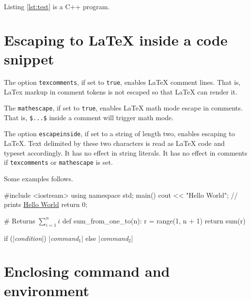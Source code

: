 \documentclass[10pt,a4paper]{article}
\begin{document}
\begin{Example}
  Listing \ref{lst:test} is a C++ program.
\end{Example}

\section{Escaping to \LaTeX{} inside a code snippet}

The option \verb|texcomments|, if set to \texttt{true}, enables \LaTeX{}
comment lines. That is, LaTex markup in comment tokens is not escaped
so that \LaTeX{} can render it.

The \verb|mathescape|, if set to \texttt{true}, enables \LaTeX{} math
mode escape in comments. That is, \verb|$...$| inside a comment will
trigger math mode.

The option \verb|escapeinside|, if set to a string of length two,
enables escaping to \LaTeX{}. Text delimited by these two characters
is read as \LaTeX{} code and typeset accordingly. It has no effect in
string literals. It has no effect in comments if \verb|texcomments| or
\verb|mathescape| is set.

Some examples follows.

\begin{Example}
\begin{pygmented}[lang=c++,texcomments]
#include <iostream>
using namespace std;
main()
{
   cout << "Hello World";  // prints \underline{Hello World}
   return 0;
}
\end{pygmented}
\end{Example}

\begin{Example}
\begin{pygmented}[lang=python,mathescape]
# Returns $\sum_{i=1}^{n}i$
def sum_from_one_to(n):
    r = range(1, n + 1)
    return sum(r)
\end{pygmented}
\end{Example}

\begin{Example}
\begin{pygmented}[lang=c,escapeinside=||]

if (|\textit{condition}|)
    |\textit{command$_1$}|
else
    |\textit{command$_2$}|
\end{pygmented}
\end{Example}


\section{Enclosing command and environment}
\end{document}
